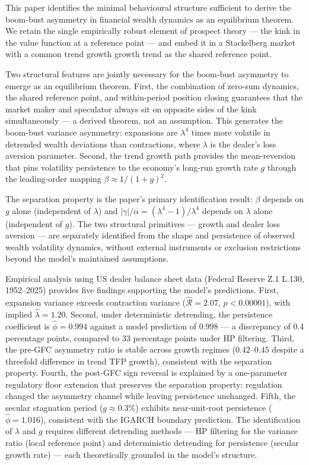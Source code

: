 \documentclass[12pt,a4paper]{article}
\theoremstyle{definition}
\begin{document}
This paper identifies the minimal behavioural structure sufficient to
derive the boom-bust asymmetry in financial wealth dynamics as an
equilibrium theorem. We retain the single empirically robust element of
prospect theory --- the kink in the value function at a reference point
--- and embed it in a Stackelberg market with a common trend growth
growth trend as the shared reference point.

Two structural features are jointly necessary for the boom-bust
asymmetry to emerge as an equilibrium theorem. First, the combination
of zero-sum dynamics, the shared reference point, and within-period
position closing guarantees that the market maker and speculator always
sit on opposite sides of the kink simultaneously --- a derived theorem,
not an assumption. This generates the boom-bust variance asymmetry:
expansions are $\lambda^4$ times more volatile in detrended wealth
deviations than contractions, where $\lambda$ is the dealer's loss
aversion parameter. Second, the trend growth path provides the
mean-reversion that pins volatility persistence to the economy's long-run
growth rate $g$ through the leading-order mapping $\beta \approx 1/(1+g)^2$.

The separation property is the paper's primary identification result:
$\beta$ depends on $g$ alone (independent of $\lambda$) and
$|\gamma|/\alpha = (\lambda^4-1)/\lambda^4$ depends on $\lambda$ alone
(independent of $g$). The two structural primitives --- growth and dealer
loss aversion --- are separately identified from the shape and persistence
of observed wealth volatility dynamics, without external instruments or
exclusion restrictions beyond the model's maintained assumptions.

Empirical analysis using US dealer balance sheet data
(Federal Reserve Z.1 L.130, 1952--2025) provides five findings
supporting the model's predictions. First, expansion variance exceeds
contraction variance ($\hat{\mathcal{R}} = 2.07$, $p < 0.00001$), with
implied $\hat{\lambda} = 1.20$. Second, under deterministic detrending,
the persistence coefficient is $\hat{\phi} = 0.994$ against a model
prediction of $0.998$ --- a discrepancy of 0.4 percentage points,
compared to 33 percentage points under HP filtering. Third, the pre-GFC
asymmetry ratio is stable across growth regimes ($0.42$--$0.45$
despite a threefold difference in trend TFP growth), consistent with
the separation property. Fourth, the post-GFC sign reversal is
explained by a one-parameter regulatory floor extension that preserves
the separation property: regulation changed the asymmetry channel
while leaving persistence unchanged. Fifth, the secular stagnation
period ($g \approx 0.3\%$) exhibits near-unit-root persistence
($\hat{\phi} = 1.016$), consistent with the IGARCH boundary prediction.
The identification of $\lambda$ and $g$ requires different detrending
methods --- HP filtering for the variance ratio (local reference point)
and deterministic detrending for persistence (secular growth rate) ---
each theoretically grounded in the model's structure.
\end{document}
